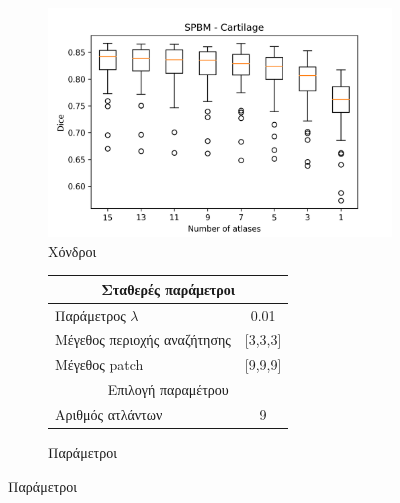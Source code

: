 \documentclass{beamer}
\begin{document}
\begin{frame}
\begin{figure}[H]
    \begin{subfigure}[b]{0.42\linewidth}
    \includegraphics[width=\linewidth]{SPBM_Number_of_atlases_Cartilage_plot.png}
    \caption{Χόνδροι}
    \end{subfigure}
    \begin{subfigure}[b]{0.42\linewidth}
        \begin{tabular}[t]{|l|c|} 
            \multicolumn{2}{c}{\footnotesize Σταθερές παράμετροι} \\
            \hline
            \footnotesize Παράμετρος $\lambda$ & \footnotesize 0.01 \\
            \hline
            \footnotesize Μέγεθος περιοχής αναζήτησης & \footnotesize  [3,3,3] \\ 
            \hline
            \footnotesize Μέγεθος patch & \footnotesize [9,9,9] \\
            \hline
            \multicolumn{2}{c}{\footnotesize Επιλογή παραμέτρου} \\
            \hline
            \footnotesize Αριθμός ατλάντων & \footnotesize 9 \\ 
            \hline
        \end{tabular}
    \caption{Παράμετροι}
    \end{subfigure}
\end{figure}

\end{frame}
\end{document}
